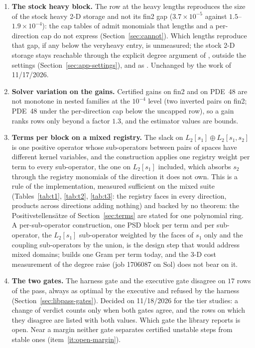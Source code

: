 \begin{enumerate}
\item \textbf{The stock heavy block.} The row at the heavy lengths reproduces the size of the stock heavy 2-D storage and not its fin2 gap ($3.7\times10^{-5}$ against $1.5$--$1.9\times10^{-4}$): the cap tables of  admit monomials that lengths and a per-direction cap do not express (Section~\ref{sec:cannot}). Which lengths reproduce that gap, if any below the veryheavy entry, is unmeasured; the stock 2-D storage stays reachable through the explicit degree argument of , outside the settings (Section~\ref{sec:app-settings}), and as . Unchanged by the work of 11/17/2026.
\item \textbf{Solver variation on the gains.} Certified gains on fin2 and on PDE~48 are not monotone in nested families at the $10^{-4}$ level (two inverted pairs on fin2; PDE~48 under the per-direction cap below the uncapped row), so a gain ranks rows only beyond a factor $1.3$, and the estimator values are bounds.
\item \textbf{Terms per block on a mixed registry.} The slack on $L_2[s_1]\oplus L_2[s_1,s_2]$ is one positive operator whose sub-operators between pairs of spaces have different kernel variables, and the construction applies one registry weight per term to every sub-operator, the one on $L_2[s_1]$ included, which absorbs $s_2$ through the registry monomials of the direction it does not own. This is a rule of the implementation, measured sufficient on the mixed suite (Tables~\ref{tab:t1}, \ref{tab:t2}, \ref{tab:t3}: the registry faces in every direction, products across directions adding nothing) and backed by no theorem: the Positivstellens\"atze of Section~\ref{sec:terms} are stated for one polynomial ring. A per-sub-operator construction, one PSD block per term and per sub-operator, the $L_2[s_1]$ sub-operator weighted by the faces of $s_1$ only and the coupling sub-operators by the union, is the design step that would address mixed domains;  builds one Gram per term today, and the 3-D cost measurement of the degree raise (job 1706087 on Sol) does not bear on it.
\item \textbf{The two gates.} The harness gate and the executive gate disagree on $17$ rows of the pass, always as optimal by the executive and refused by the harness (Section~\ref{sec:libpass-gates}). Decided on 11/18/2026 for the tier studies: a change of verdict counts only when both gates agree, and the rows on which they disagree are listed with both values. Which gate the library reports is open. Near a margin neither gate separates certified unstable steps from stable ones (item~\ref{it:open-margin}).

\end{enumerate}
